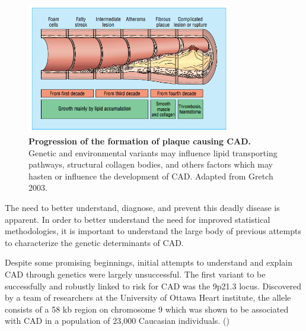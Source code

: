 \begin{figure}[h]
\centering
\includegraphics[width=0.8\textwidth]{Figures/cad.png}
\caption[Progression of the formation of plaque causing \ac{CAD}.]{\textbf{Progression of the formation of plaque causing \ac{CAD}.} Genetic and environmental variants may influence lipid transporting pathways, structural collagen bodies, and others factors which may hasten or influence the development of \ac{CAD}. Adapted from Gretch 2003.}
\end{figure}

The need to better understand, diagnose, and prevent this deadly disease is apparent.  In order to better understand the need for improved statistical methodologies, it is important to understand the large body of previous attempts to characterize the genetic determinants of \ac{CAD}.

Despite some promising beginnings, initial attempts to understand and explain \ac{CAD} through genetics were largely unsuccessful. \citep{Visscher2012} The first variant to be successfully and robustly linked to risk for \ac{CAD} was the 9p21.3 locus. Discovered by a team of researchers at the University of Ottawa Heart institute, the allele consists of a 58 \ac{kb} region on chromosome 9 which was shown to be associated with \ac{CAD} in a population of 23,000 Caucasian individuals. (\cite{McPherson2016})

